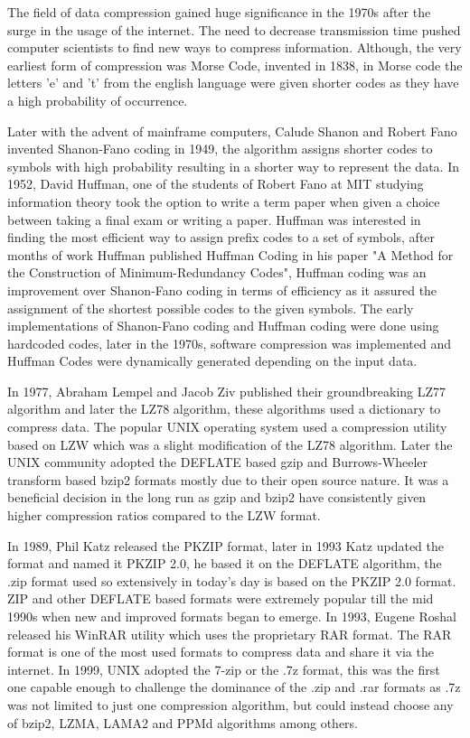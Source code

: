 \documentclass{article}
\begin{document}
The field of data compression gained huge significance in the 1970s after the surge in the usage of the internet. The need to decrease transmission time pushed computer scientists to find new ways to compress information. Although, the very earliest form of compression was Morse Code, invented in 1838, in Morse code the letters 'e' and 't' from the english language were given shorter codes as they have a high probability of occurrence.

Later with the advent of mainframe computers, Calude Shanon and Robert Fano invented Shanon-Fano coding in 1949\cite{shannon1948mathematical}, the algorithm assigns shorter codes to symbols with high probability resulting in a shorter way to represent the data. In 1952, David Huffman, one of the students of Robert Fano at MIT studying information theory took the option to write a term paper when given a choice between taking a final exam or writing a paper. Huffman was interested in finding the most efficient way to assign prefix codes to a set of symbols, after months of work Huffman published Huffman Coding in his paper "A Method for the Construction of Minimum-Redundancy Codes"\cite{huffman1952method}, Huffman coding was an improvement over Shanon-Fano coding in terms of efficiency as it assured the assignment of the shortest possible codes to the given symbols. The early implementations of Shanon-Fano coding and Huffman coding were done using hardcoded codes, later in the 1970s, software compression was implemented and Huffman Codes were dynamically generated depending on the input data.

In 1977, Abraham Lempel and Jacob Ziv published\cite{ziv1977universal} their groundbreaking LZ77 algorithm and later the LZ78 algorithm, these algorithms used a dictionary to compress data. The popular UNIX operating system used a compression utility based on LZW which was a slight modification of the LZ78 algorithm. Later the UNIX community adopted the DEFLATE based gzip and Burrows-Wheeler transform based bzip2 formats mostly due to their open source nature\cite{burrows1994block}. It was a beneficial decision in the long run as gzip and bzip2 have consistently given higher compression ratios compared to the LZW format.


In 1989, Phil Katz released the PKZIP format, later in 1993 Katz updated the format and named it PKZIP 2.0, he based it on the DEFLATE algorithm, the .zip format used so extensively in today's day is  based on the PKZIP 2.0 format. ZIP and other DEFLATE based formats were extremely popular till the mid 1990s when new and improved formats began to emerge. In 1993, Eugene Roshal released his WinRAR utility which uses the proprietary RAR format. The RAR format is one of the most used formats to compress data and share it via the internet. In 1999, UNIX adopted the 7-zip or the .7z format, this was the first one capable enough to challenge the dominance of the .zip and .rar formats as .7z was not limited to just one compression algorithm, but could instead choose any of bzip2, LZMA, LAMA2 and PPMd algorithms among others. 
\end{document}
